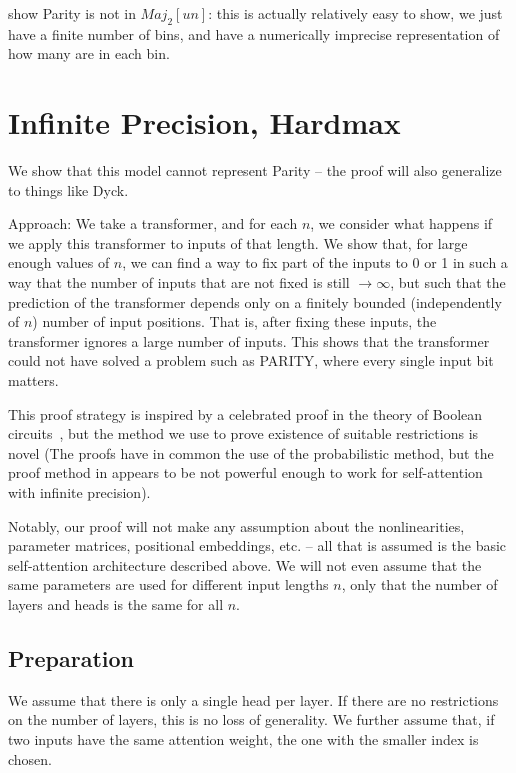 \documentclass[11pt,a4paper]{article}
\begin{document}
show Parity is not in $Maj_2[un]$: this is actually relatively easy to show, we just have a finite number of bins, and have a numerically imprecise representation of how many are in each bin.



\section{Infinite Precision, Hardmax}

We show that this model cannot represent Parity -- the proof will also generalize to things like Dyck.

Approach:
We take a transformer, and for each $n$, we consider what happens if we apply this transformer to inputs of that length.
We show that, for large enough values of $n$, we can find a way to fix part of the inputs to 0 or 1 in such a way that the number of inputs that are not fixed is still $\rightarrow \infty$, but such that the prediction of the transformer depends only on a finitely bounded (independently of $n$) number of input positions.
That is, after fixing these inputs, the transformer ignores a large number of inputs.
This shows that the transformer could not have solved a problem such as PARITY, where every single input bit matters.

This proof strategy is inspired by a celebrated proof in the theory of Boolean circuits~\cite{furst1984parity}, but the method we use to prove existence of suitable restrictions is novel (The proofs have in common the use of the probabilistic method, but the proof method in \cite{furst1984parity} appears to be not powerful enough to work for self-attention with infinite precision).


Notably, our proof will not make any assumption about the nonlinearities, parameter matrices, positional embeddings, etc. -- all that is assumed is the basic self-attention architecture described above.
We will not even assume that the same parameters are used for different input lengths $n$, only that the number of layers and heads is the same for all $n$.


\subsection{Preparation}

We assume that there is only a single head per layer. If there are no restrictions on the number of layers, this is no loss of generality.
We further assume that, if two inputs have the same attention weight, the one with the smaller index is chosen.
\end{document}
